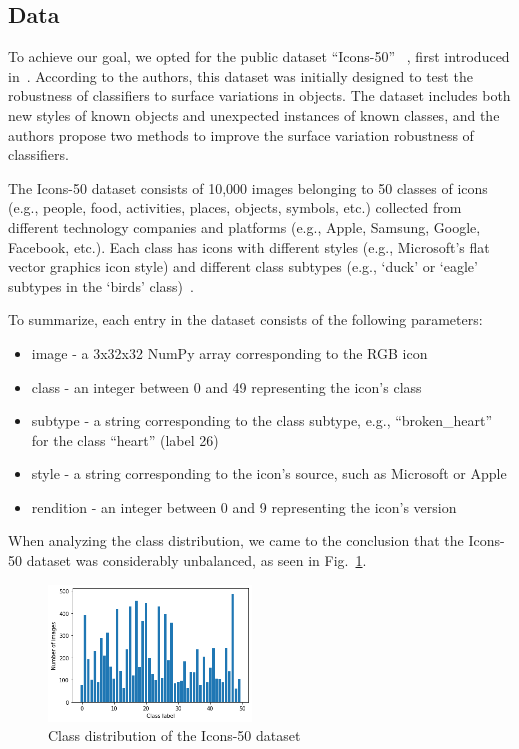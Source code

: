 \subsection{Data}\label{subsec:data}
To achieve our goal, we opted for the public dataset ``Icons-50''~\cite{Icons50} , first introduced in~\cite{Hendrycks2018}.
According to the authors, this dataset was initially designed to test the robustness of classifiers to surface variations in objects.
The dataset includes both new styles of known objects and unexpected instances of known classes, and the authors propose two methods to improve the surface variation robustness of classifiers.

The Icons-50 dataset consists of 10,000 images belonging to 50 classes of icons (e.g., people, food, activities, places, objects, symbols, etc.) collected from different technology companies and platforms (e.g., Apple, Samsung, Google, Facebook, etc.).
Each class has icons with different styles (e.g., Microsoft's flat vector graphics icon style) and different class subtypes (e.g., `duck' or `eagle' subtypes in the `birds' class)~\cite{Icons50}.

To summarize, each entry in the dataset consists of the following parameters:
\begin{itemize}
    \item image - a 3x32x32 NumPy array corresponding to the RGB icon
    \item class - an integer between 0 and 49 representing the icon's class
    \item subtype - a string corresponding to the class subtype, e.g., ``broken\_heart'' for the class ``heart'' (label 26)
    \item style - a string corresponding to the icon's source, such as Microsoft or Apple
    \item rendition - an integer between 0 and 9 representing the icon's version
\end{itemize}

When analyzing the class distribution, we came to the conclusion that the Icons-50 dataset was considerably unbalanced, as seen in Fig.~\ref{fig:Icons50ClassDist}.

\begin{figure}[htbp]
    \centering
    \includegraphics[width=0.48\textwidth]{images/icons50/class_dist}
    \caption{Class distribution of the Icons-50 dataset}
    \label{fig:Icons50ClassDist}
\end{figure}

